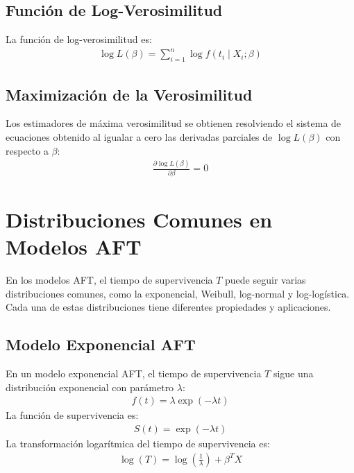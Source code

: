 \documentclass[a4paper]{report} %
\begin{document}
\subsection*{Funci\'on de Log-Verosimilitud}
La funci\'on de log-verosimilitud es:
\begin{eqnarray*}
\log L(\beta) = \sum_{i=1}^n \log f(t_i \mid X_i; \beta)
\end{eqnarray*}

\subsection*{Maximizaci\'on de la Verosimilitud}
Los estimadores de m\'axima verosimilitud se obtienen resolviendo el sistema de ecuaciones obtenido al igualar a cero las derivadas parciales de $\log L(\beta)$ con respecto a $\beta$:
\begin{eqnarray*}
\frac{\partial \log L(\beta)}{\partial \beta} = 0
\end{eqnarray*}

\section*{Distribuciones Comunes en Modelos AFT}
En los modelos AFT, el tiempo de supervivencia $T$ puede seguir varias distribuciones comunes, como la exponencial, Weibull, log-normal y log-log\'istica. Cada una de estas distribuciones tiene diferentes propiedades y aplicaciones.

\subsection*{Modelo Exponencial AFT}
En un modelo exponencial AFT, el tiempo de supervivencia $T$ sigue una distribuci\'on exponencial con par\'ametro $\lambda$:
\begin{eqnarray*}
f(t) = \lambda \exp(-\lambda t)
\end{eqnarray*}
La funci\'on de supervivencia es:
\begin{eqnarray*}
S(t) = \exp(-\lambda t)
\end{eqnarray*}
La transformaci\'on logar\'itmica del tiempo de supervivencia es:
\begin{eqnarray*}
\log(T) = \log\left(\frac{1}{\lambda}\right) + \beta^T X
\end{eqnarray*}
\end{document}

